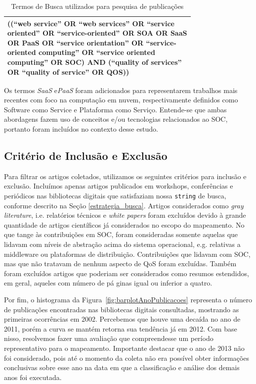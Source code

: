 \begin{table}[ht]
\centering
\caption{Termos de Busca utilizados para pesquisa de publicações}
\label{tab:exTable1}
\begin{tabular}{p{0.75\linewidth}}
\hline
((``web service'' OR ``web services'' OR ``service oriented'' OR ``service-oriented'' OR SOA OR SaaS OR PaaS OR ``service orientation'' OR ``service-oriented computing'' OR ``service oriented computing'' OR SOC) AND (``quality of services'' OR ``quality of service'' OR QOS)) \\
\hline
\end{tabular}
\end{table}

Os termos \textit{SaaS} e\textit{PaaS} foram adicionados para representarem trabalhos mais recentes com foco na computação em nuvem, respectivamente definidos como Software como Service e Plataforma como Serviço. Entende-se que ambas abordagens fazem uso de conceitos e/ou tecnologias relacionados ao SOC, portanto foram incluídos no contexto desse estudo. 

\subsection{Crit\'{e}rio de Inclusão e Exclusão}\label{criterios_inc_exc}

Para filtrar os artigos coletados, utilizamos os seguintes critérios para inclus\~{a}o e exclus\~{a}o. Inclu\'{i}mos apenas artigos publicados em workshops, confer\^{e}ncias e peri\'{o}dicos nas bibliotecas digitais que satisfaziam nossa \texttt{string} de busca, conforme descrito na Se\c{c}\~{a}o \ref{estrategia_busca}. Artigos considerados como \emph{gray literature}, i.e. relat\'{o}rios t\'{e}cnicos e \emph{white papers} foram exclu\'{i}dos devido à grande quantidade de artigos científicos já considerados no escopo do mapeamento. No que tange \`{a}s contribui\c{c}\~{o}es em SOC, foram consideradas somente aquelas que lidavam com n\'{i}veis de abstra\c{c}\~{a}o acima do sistema operacional, e.g. relativas a middleware ou plataformas de distribui\c{c}\~{a}o. Contribui\c{c}\~{o}es que lidavam com SOC, mas que n\~{a}o tratavam de nenhum aspecto de QoS foram exclu\'{i}das. Tamb\'{e}m foram exclu\'{i}dos artigos que poderiam ser considerados como resumos estendidos, em geral, aqueles com n\'{u}mero de p\'{a}
ginas igual ou inferior a quatro. 

Por fim, o histograma da Figura~\ref{fig:barplotAnoPublicacoes} representa o número de publicações encontradas nas bibliotecas digitais consultadas, mostrando as primeiras ocorr\^{e}ncias em 2002. Percebemos que houve uma decaída no ano de 2011, porém a curva se mantém retorna sua tendência já em 2012. Com base nisso, resolvemos fazer uma avalia\c{c}\~{a}o que compreendesse um per\'{i}odo representativo para o mapeamento. Importante destacar que o ano de 2013 n\~{a}o foi considerado, pois at\'{e} o momento da coleta n\~{a}o era poss\'{i}vel obter informa\c{c}\~{o}es conclusivas sobre esse ano na data em que a classificação e análise dos demais anos foi executada.

